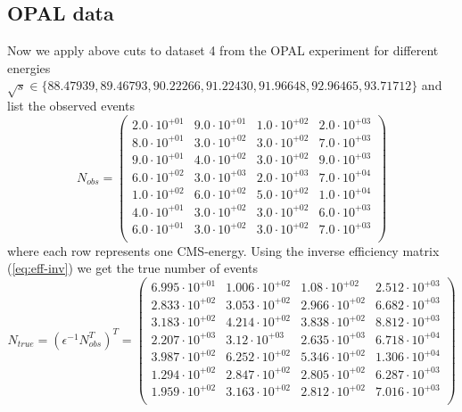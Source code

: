 \documentclass[]{article}
\begin{document}
\subsection{OPAL data}
Now we apply above cuts to dataset 4 from the OPAL experiment for different energies 
\newline
$\sqrt{s} \in \{88.47939, 89.46793, 90.22266, 91.22430, 91.96648, 92.96465, 93.71712\}$ and list the observed events
\begin{equation}
N_{obs}=\begin{pmatrix}
   2.0\cdot 10^{+01} & 9.0\cdot 10^{+01} & 1.0\cdot 10^{+02} & 2.0\cdot 10^{+03} \\
   8.0\cdot 10^{+01} & 3.0\cdot 10^{+02} & 3.0\cdot 10^{+02} & 7.0\cdot 10^{+03} \\
   9.0\cdot 10^{+01} & 4.0\cdot 10^{+02} & 3.0\cdot 10^{+02} & 9.0\cdot 10^{+03} \\
   6.0\cdot 10^{+02} & 3.0\cdot 10^{+03} & 2.0\cdot 10^{+03} & 7.0\cdot 10^{+04} \\
   1.0\cdot 10^{+02} & 6.0\cdot 10^{+02} & 5.0\cdot 10^{+02} & 1.0\cdot 10^{+04} \\
   4.0\cdot 10^{+01} & 3.0\cdot 10^{+02} & 3.0\cdot 10^{+02} & 6.0\cdot 10^{+03} \\
   6.0\cdot 10^{+01} & 3.0\cdot 10^{+02} & 3.0\cdot 10^{+02} & 7.0\cdot 10^{+03} \\
\end{pmatrix}
\end{equation}
where each row represents one CMS-energy.
Using the inverse efficiency matrix (\ref{eq:eff-inv}) we get the true number of events
\begin{equation}
N_{true} = (\epsilon^{-1}N_{obs}^T)^T = \begin{pmatrix}
   6.995\cdot 10^{+01} & 1.006\cdot 10^{+02} & 1.08\cdot 10^{+02} & 2.512\cdot 10^{+03} \\
   2.833\cdot 10^{+02} & 3.053\cdot 10^{+02} & 2.966\cdot 10^{+02} & 6.682\cdot 10^{+03} \\
   3.183\cdot 10^{+02} & 4.214\cdot 10^{+02} & 3.838\cdot 10^{+02} & 8.812\cdot 10^{+03} \\
   2.207\cdot 10^{+03} & 3.12\cdot 10^{+03} & 2.635\cdot 10^{+03} & 6.718\cdot 10^{+04} \\
   3.987\cdot 10^{+02} & 6.252\cdot 10^{+02} & 5.346\cdot 10^{+02} & 1.306\cdot 10^{+04} \\
   1.294\cdot 10^{+02} & 2.847\cdot 10^{+02} & 2.805\cdot 10^{+02} & 6.287\cdot 10^{+03} \\
   1.959\cdot 10^{+02} & 3.163\cdot 10^{+02} & 2.812\cdot 10^{+02} & 7.016\cdot 10^{+03} \\
\end{pmatrix}
\end{equation}
\end{document}
